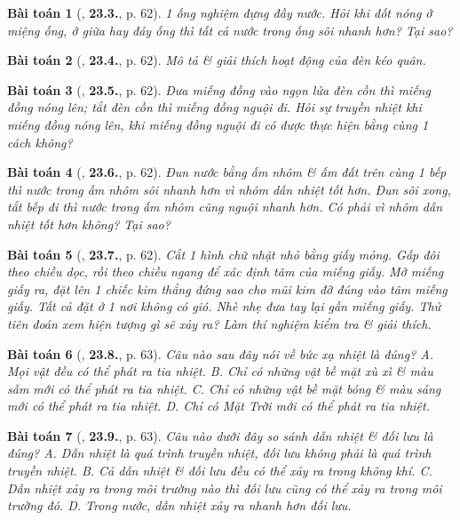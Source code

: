 \documentclass{article}
\numberwithin{equation}{section}
\newtheorem{baitoan}{Bài toán}
\begin{document}
\begin{baitoan}[\cite{SBT_Vat_Ly_8}, \textbf{23.3.}, p. 62]
	1 ống nghiệm đựng đầy nước. Hỏi khi đốt nóng ở miệng ống, ở giữa hay đáy ống thì tất cả nước trong ống sôi nhanh hơn? Tại sao?
\end{baitoan}

\begin{baitoan}[\cite{SBT_Vat_Ly_8}, \textbf{23.4.}, p. 62]
	Mô tả \& giải thích hoạt động của đèn kéo quân.
\end{baitoan}

\begin{baitoan}[\cite{SBT_Vat_Ly_8}, \textbf{23.5.}, p. 62]
	Đưa miếng đồng vào ngọn lửa đèn cồn thì miếng đồng nóng lên; tắt đèn cồn thì miếng đồng nguội đi. Hỏi sự truyền nhiệt khi miếng đồng nóng lên, khi miếng đồng nguội đi có được thực hiện bằng cùng 1 cách không?
\end{baitoan}

\begin{baitoan}[\cite{SBT_Vat_Ly_8}, \textbf{23.6.}, p. 62]
	Đun nước bằng ấm nhôm \& ấm đất trên cùng 1 bếp thì nước trong ấm nhôm sôi nhanh hơn vì nhôm dẫn nhiệt tốt hơn. Đun sôi xong, tắt bếp đi thì nước trong ấm nhôm cũng nguội nhanh hơn. Có phải vì nhôm dẫn nhiệt tốt hơn không? Tại sao?
\end{baitoan}

\begin{baitoan}[\cite{SBT_Vat_Ly_8}, \textbf{23.7.}, p. 62]
	Cắt 1 hình chữ nhật nhỏ bằng giấy mỏng. Gấp đôi theo chiều dọc, rồi theo chiều ngang để xác định tâm của miếng giấy. Mở miếng giấy ra, đặt lên 1 chiếc kim thẳng đứng sao cho mũi kim đỡ đúng vào tâm miếng giấy. Tất cả đặt ở 1 nơi không có gió. Nhè nhẹ đưa tay lại gần miếng giấy. Thử tiên đoán xem hiện tượng gì sẽ xảy ra? Làm thí nghiệm kiểm tra \& giải thích.
\end{baitoan}

\begin{baitoan}[\cite{SBT_Vat_Ly_8}, \textbf{23.8.}, p. 63]
	Câu nào sau đây nói về bức xạ nhiệt là đúng? {\sf A.} Mọi vật đều có thể phát ra tia nhiệt. {\sf B.} Chỉ có những vật bề mặt xù xì \& màu sẫm mới có thể phát ra tia nhiệt. {\sf C.} Chỉ có những vật bề mặt bóng \& màu sáng mới có thể phát ra tia nhiệt. {\sf D.} Chỉ có Mặt Trời mới có thể phát ra tia nhiệt.
\end{baitoan}

\begin{baitoan}[\cite{SBT_Vat_Ly_8}, \textbf{23.9.}, p. 63]
	Câu nào dưới đây so sánh dẫn nhiệt \& đối lưu là đúng? {\sf A.} Dẫn nhiệt là quá trình truyền nhiệt, đối lưu không phải là quá trình truyền nhiệt. {\sf B.} Cả dẫn nhiệt \& đối lưu đều có thể xảy ra trong không khí. {\sf C.} Dẫn nhiệt xảy ra trong môi trường nào thì đối lưu cũng có thể xảy ra trong môi trường đó. {\sf D.} Trong nước, dẫn nhiệt xảy ra nhanh hơn đối lưu.
\end{baitoan}
\end{document}
